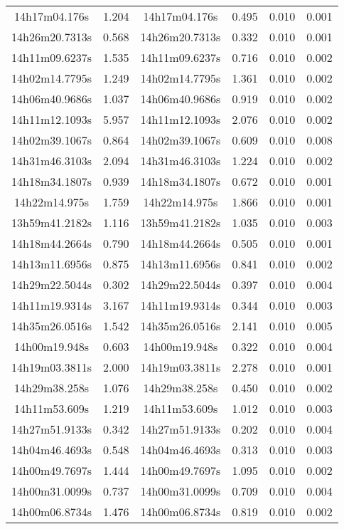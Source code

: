 \begin{table}
\begin{tabular}{cccccc}
14h17m04.176s & 1.204 & 14h17m04.176s & 0.495 & 0.010 & 0.001 \\
14h26m20.7313s & 0.568 & 14h26m20.7313s & 0.332 & 0.010 & 0.001 \\
14h11m09.6237s & 1.535 & 14h11m09.6237s & 0.716 & 0.010 & 0.002 \\
14h02m14.7795s & 1.249 & 14h02m14.7795s & 1.361 & 0.010 & 0.002 \\
14h06m40.9686s & 1.037 & 14h06m40.9686s & 0.919 & 0.010 & 0.002 \\
14h11m12.1093s & 5.957 & 14h11m12.1093s & 2.076 & 0.010 & 0.002 \\
14h02m39.1067s & 0.864 & 14h02m39.1067s & 0.609 & 0.010 & 0.008 \\
14h31m46.3103s & 2.094 & 14h31m46.3103s & 1.224 & 0.010 & 0.002 \\
14h18m34.1807s & 0.939 & 14h18m34.1807s & 0.672 & 0.010 & 0.001 \\
14h22m14.975s & 1.759 & 14h22m14.975s & 1.866 & 0.010 & 0.001 \\
13h59m41.2182s & 1.116 & 13h59m41.2182s & 1.035 & 0.010 & 0.003 \\
14h18m44.2664s & 0.790 & 14h18m44.2664s & 0.505 & 0.010 & 0.001 \\
14h13m11.6956s & 0.875 & 14h13m11.6956s & 0.841 & 0.010 & 0.002 \\
14h29m22.5044s & 0.302 & 14h29m22.5044s & 0.397 & 0.010 & 0.004 \\
14h11m19.9314s & 3.167 & 14h11m19.9314s & 0.344 & 0.010 & 0.003 \\
14h35m26.0516s & 1.542 & 14h35m26.0516s & 2.141 & 0.010 & 0.005 \\
14h00m19.948s & 0.603 & 14h00m19.948s & 0.322 & 0.010 & 0.004 \\
14h19m03.3811s & 2.000 & 14h19m03.3811s & 2.278 & 0.010 & 0.001 \\
14h29m38.258s & 1.076 & 14h29m38.258s & 0.450 & 0.010 & 0.002 \\
14h11m53.609s & 1.219 & 14h11m53.609s & 1.012 & 0.010 & 0.003 \\
14h27m51.9133s & 0.342 & 14h27m51.9133s & 0.202 & 0.010 & 0.004 \\
14h04m46.4693s & 0.548 & 14h04m46.4693s & 0.313 & 0.010 & 0.003 \\
14h00m49.7697s & 1.444 & 14h00m49.7697s & 1.095 & 0.010 & 0.002 \\
14h00m31.0099s & 0.737 & 14h00m31.0099s & 0.709 & 0.010 & 0.004 \\
14h00m06.8734s & 1.476 & 14h00m06.8734s & 0.819 & 0.010 & 0.002 \\

\end{tabular}
\end{table}
